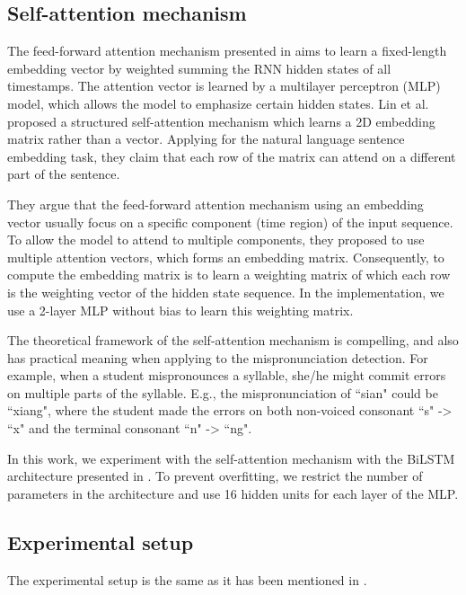 \subsection{Self-attention mechanism}

The feed-forward attention mechanism presented in  aims to learn a fixed-length embedding vector by weighted summing the RNN hidden states of all timestamps. The attention vector is learned by a multilayer perceptron (MLP) model, which allows the model to emphasize certain hidden states. Lin et al. \cite{Lin2017} proposed a structured self-attention mechanism which learns a 2D embedding matrix rather than a vector. Applying for the natural language sentence embedding task, they claim that each row of the matrix can attend on a different part of the sentence. 

They argue that the feed-forward attention mechanism using an embedding vector usually focus on a specific component (time region) of the input sequence. To allow the model to attend to multiple components, they proposed to use multiple attention vectors, which forms an embedding matrix. Consequently, to compute the embedding matrix is to learn a weighting matrix of which each row is the weighting vector of the hidden state sequence. In the implementation, we use a 2-layer MLP without bias to learn this weighting matrix.

The theoretical framework of the self-attention mechanism is compelling, and also has practical meaning when applying to the mispronunciation detection. For example, when a student mispronounces a syllable, she/he might commit errors on multiple parts of the syllable. E.g., the mispronunciation of ``sian" could be ``xiang", where the student made the errors on both non-voiced consonant ``s" -> ``x" and the terminal consonant ``n" -> ``ng".

In this work, we experiment with the self-attention mechanism with the BiLSTM architecture presented in . To prevent overfitting, we restrict the number of parameters in the architecture and use 16 hidden units for each layer of the MLP.

\subsection{Experimental setup}

The experimental setup is the same as it has been mentioned in .

